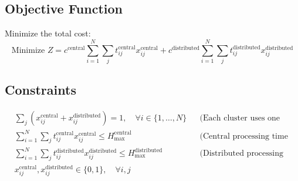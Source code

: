 \documentclass{article}
\begin{document}
\subsection*{Objective Function}
Minimize the total cost:
\[
\text{Minimize } Z = c^{\text{central}} \sum_{i=1}^{N} \sum_{j} t_{ij}^{\text{central}} x_{ij}^{\text{central}} + c^{\text{distributed}} \sum_{i=1}^{N} \sum_{j} t_{ij}^{\text{distributed}} x_{ij}^{\text{distributed}}
\]

\subsection*{Constraints}
\begin{align}
    & \sum_{j} (x_{ij}^{\text{central}} + x_{ij}^{\text{distributed}}) = 1, \quad \forall i \in \{1, \ldots, N\} && \text{(Each cluster uses one intervention)} \\
    & \sum_{i=1}^{N} \sum_{j} t_{ij}^{\text{central}} x_{ij}^{\text{central}} \leq H^{\text{central}}_{\max} && \text{(Central processing time limit)} \\
    & \sum_{i=1}^{N} \sum_{j} t_{ij}^{\text{distributed}} x_{ij}^{\text{distributed}} \leq H^{\text{distributed}}_{\max} && \text{(Distributed processing time limit)} \\
    & x_{ij}^{\text{central}}, x_{ij}^{\text{distributed}} \in \{0, 1\}, \quad \forall i, j
\end{align}
\end{document}
